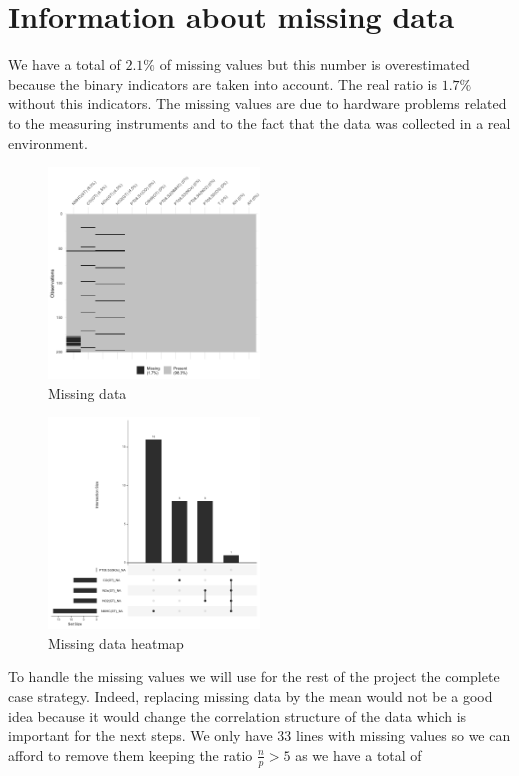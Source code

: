 \section{Information about missing data}
We have a total of $2.1\%$ of missing values but this number is overestimated because the binary indicators are taken into account. The real ratio is $1.7\%$
without this indicators.
The missing values are due to hardware problems related to the measuring instruments
and to the fact that the data was collected in a real environment.

\begin{figure}[H]
  \centering
  \includegraphics[width=0.5\textwidth]{figs/missing_values.png}
  \caption{Missing data}
  \label{fig:missing_data}
\end{figure}

\begin{figure}[H]
  \centering
  \includegraphics[width=0.5\textwidth]{figs/missing_values_heatmap.png}
  \caption{Missing data heatmap}
  \label{fig:missing_data_heatmap}
\end{figure}

To handle the missing values we will use for the rest of the project the complete case strategy.
Indeed, replacing missing data by the mean would not be a good idea because it would change the correlation structure of the data which is important for the next steps.
We only have 33 lines with missing values so we can afford to remove them keeping the ratio $\frac{n}{p} > 5$ as we have a total of 


